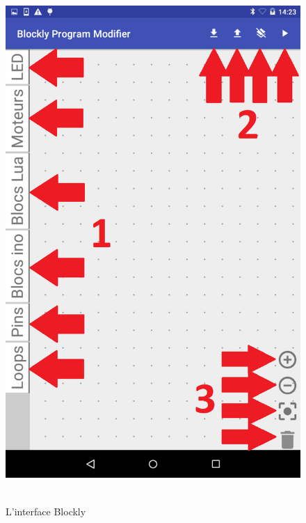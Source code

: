 \documentclass[12pt,francais]{report}
\begin{document}
\newpage

\begin{figure}[!h]
\centering
\includegraphics[scale=0.45]{./images/manuel1.png}~\\[1.5cm]
\caption{L'interface Blockly}
\end{figure}

\newpage
\end{document}
